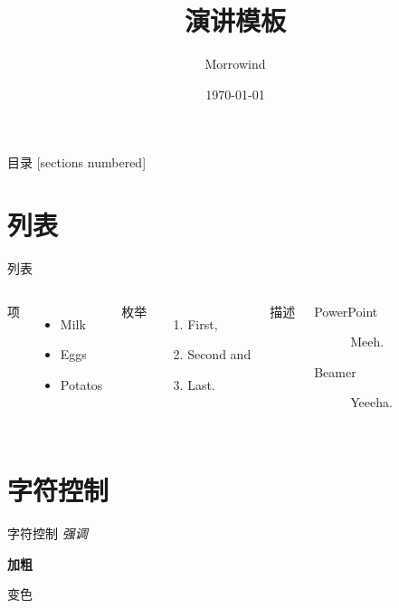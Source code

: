 \documentclass[10pt, aspectraio=169]{beamer}  %
\title{演讲模板}
\subtitle{}
\date{\today}
\author{Morrowind}
\begin{document}
\maketitle

\begin{frame}{目录}
  [sections numbered]
  \tableofcontents[hideallsubsections]
\end{frame}

\section{列表}
\begin{frame}{列表}
    \begin{columns}[T,onlytextwidth]
            项
            \begin{itemize}
                \item Milk \item Eggs \item Potatos
            \end{itemize}
    
            枚举
            \begin{enumerate}
                \item First, \item Second and \item Last.
            \end{enumerate}
    
            描述
            \begin{description}
                \item[PowerPoint] Meeh. \item[Beamer] Yeeeha.
            \end{description}
    \end{columns}
\end{frame}

\section{字符控制}
\begin{frame}{字符控制}
    \emph{强调}

    \textbf{加粗}

    \alert{变色}
\end{frame}
\end{document}
